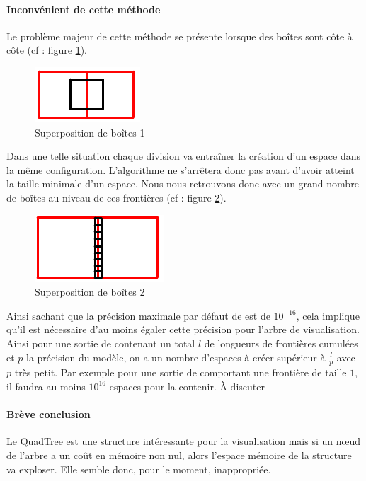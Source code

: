 \paragraph{Inconvénient de cette méthode}Le problème majeur de cette méthode se présente lorsque des boîtes sont côte à côte (cf : figure \ref{fig:frontiere}).
\begin{figure}[htbp]
\centering
\includegraphics[scale=0.40]{img/QT7}
\caption{Superposition de boîtes 1}
\label{fig:frontiere}
\end{figure}
Dans une telle situation chaque division va entraîner la création d'un espace dans la même configuration. L'algorithme ne s'arrêtera donc pas avant d'avoir atteint la taille minimale d'un espace. Nous nous retrouvons donc avec un grand nombre de boîtes au niveau de ces \og frontières\fg{} (cf : figure \ref{fig:frontiere2}).
\begin{figure}[htbp]
\centering
\includegraphics[scale=0.40]{img/QT9}
\caption{Superposition de boîtes 2}
\label{fig:frontiere2}
\end{figure}
Ainsi sachant que la précision maximale par défaut de \realpaver{} est de $10^{-16}$, cela implique qu'il est nécessaire d'au moins égaler cette précision pour l'arbre de visualisation. Ainsi pour une sortie de \realpaver{} contenant un total $l$ de longueurs de \og frontières \fg{}  cumulées et $p$ la précision du modèle, on a un nombre d'espaces à créer supérieur à $\frac{l}{p}$ avec $p$ très petit. Par exemple pour une sortie de \realpaver{} comportant une \og frontière \fg{} de taille $1$, il faudra au moins $10^{16}$ espaces pour la contenir. {\color{red} À discuter}

\paragraph{Brève conclusion} Le QuadTree est une structure intéressante pour la visualisation mais si un nœud de l'arbre a un coût en mémoire non nul, alors l'espace mémoire de la structure va exploser. Elle semble donc, pour le moment, inappropriée.

